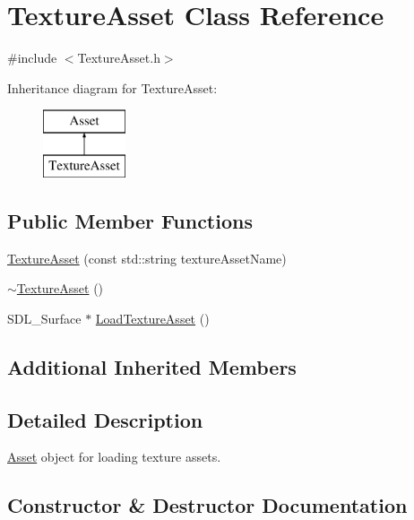 \hypertarget{class_texture_asset}{}\section{Texture\+Asset Class Reference}
\label{class_texture_asset}


{\ttfamily \#include $<$Texture\+Asset.\+h$>$}

Inheritance diagram for Texture\+Asset\+:\begin{figure}[H]
\begin{center}
\leavevmode
\includegraphics[height=2.000000cm]{class_texture_asset}
\end{center}
\end{figure}
\subsection*{Public Member Functions}
\begin{DoxyCompactItemize}
\item 
\mbox{\hyperlink{class_texture_asset_a09664001cf303951a8f5eb1ccc6bcd37}{Texture\+Asset}} (const std\+::string texture\+Asset\+Name)
\item 
\mbox{\hyperlink{class_texture_asset_a115d65cc1ce33a8eb9cc1762497c4537}{$\sim$\+Texture\+Asset}} ()
\item 
S\+D\+L\+\_\+\+Surface $\ast$ \mbox{\hyperlink{class_texture_asset_aef089e5da2cf3bd751e0fad708aa8d8b}{Load\+Texture\+Asset}} ()
\end{DoxyCompactItemize}
\subsection*{Additional Inherited Members}


\subsection{Detailed Description}
\mbox{\hyperlink{class_asset}{Asset}} object for loading texture assets. 

\subsection{Constructor \& Destructor Documentation}
\mbox{\label{class_texture_asset_a09664001cf303951a8f5eb1ccc6bcd37}} 
